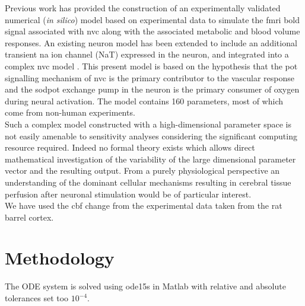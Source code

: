 \documentclass[12pt]{article}
\numberwithin{equation}{section}
\begin{document}
Previous work \cite{Mathias2018} has provided  the construction of an experimentally validated numerical (\textit{in silico}) model based on experimental data to simulate the \gls{fmri} \gls{bold} signal associated with \gls{nvc} along with the associated metabolic and blood volume responses. An existing neuron model \citep{Mathias2017, Mathias2017a} has been extended to include an additional transient \gls{na} ion channel (NaT) expressed in the neuron, and integrated into a complex \gls{nvc} model \citep{Dormanns2015, Dormanns2016, Kenny2017a}. This present model is based on the hypothesis that the \gls{pot} signalling mechanism of \gls{nvc} is the primary contributor to the vascular response and the \gls{sodpot} exchange pump in the neuron is the primary consumer of oxygen during neural activation. The model contains 160 parameters, most of which come from non-human experiments. \\
Such a complex model constructed with a high-dimensional parameter space is not easily amenable to sensitivity analyses considering the significant computing resource required. Indeed no formal theory exists which allows direct mathematical investigation of the variability of the large dimensional parameter vector and the resulting output. 
From a purely physiological perspective an understanding of the dominant cellular mechanisms resulting in cerebral tissue perfusion after neuronal stimulation would be of particular interest. \\
  
  We have used the \gls{cbf} change from the experimental data \cite{Zheng2010} taken from the rat barrel cortex. 
\section{Methodology}
The ODE system is solved using ode15s in Matlab with relative and absolute tolerances set too $10^{-4}$.
\end{document}
